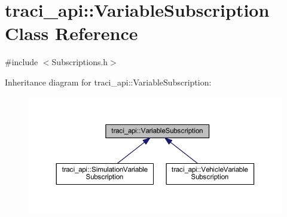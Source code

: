 \hypertarget{classtraci__api_1_1_variable_subscription}{}\section{traci\+\_\+api\+:\+:Variable\+Subscription Class Reference}
\label{classtraci__api_1_1_variable_subscription}


{\ttfamily \#include $<$Subscriptions.\+h$>$}



Inheritance diagram for traci\+\_\+api\+:\+:Variable\+Subscription\+:\nopagebreak
\begin{figure}[H]
\begin{center}
\leavevmode
\includegraphics[width=350pt]{classtraci__api_1_1_variable_subscription__inherit__graph}
\end{center}
\end{figure}
